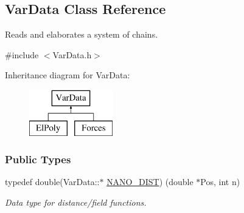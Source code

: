 \hypertarget{classVarData}{}\subsection{Var\+Data Class Reference}
\label{classVarData}


Reads and elaborates a system of chains.  




{\ttfamily \#include $<$Var\+Data.\+h$>$}

Inheritance diagram for Var\+Data\+:\begin{figure}[H]
\begin{center}
\leavevmode
\includegraphics[height=2.000000cm]{classVarData}
\end{center}
\end{figure}
\subsubsection*{Public Types}
\begin{DoxyCompactItemize}
\item 
typedef double(Var\+Data\+::$\ast$ \hyperlink{classVarData_adbdcbdf95f57b050f2d42371980f2c89}{N\+A\+N\+O\+\_\+\+D\+I\+ST}) (double $\ast$Pos, int n)\hypertarget{classVarData_adbdcbdf95f57b050f2d42371980f2c89}{}\label{classVarData_adbdcbdf95f57b050f2d42371980f2c89}

\begin{DoxyCompactList}\small\item\em Data type for distance/field functions. \end{DoxyCompactList}\end{DoxyCompactItemize}
